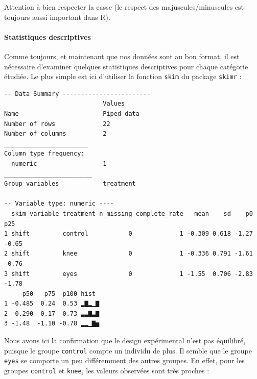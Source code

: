 \documentclass[a4paperpaper,]{article}
\newenvironment{Shaded}{\begin{snugshade}}{\end{snugshade}}
\newcommand{\KeywordTok}[1]{\textcolor[rgb]{0.12,0.11,0.11}{\textbf{#1}}}
\newcommand{\NormalTok}[1]{\textcolor[rgb]{0.12,0.11,0.11}{#1}}
\newcommand{\OperatorTok}[1]{\textcolor[rgb]{0.12,0.11,0.11}{#1}}
\newcommand{\StringTok}[1]{\textcolor[rgb]{0.75,0.01,0.01}{#1}}
\let\oldparagraph\paragraph
\renewcommand{\paragraph}[1]{\oldparagraph{#1}\mbox{}}
\begin{document}
Attention à bien respecter la casse (le respect des majuscules/minuscules est toujours aussi important dans R).

\hypertarget{statistiques-descriptives-3}{%
\paragraph{Statistiques descriptives}\label{statistiques-descriptives-3}}

Comme toujours, et maintenant que nos données sont au bon format, il est nécessaire d'examiner quelques statistiques descriptives pour chaque catégorie étudiée. Le plus simple est ici d'utiliser la fonction \texttt{skim} du package \texttt{skimr} :

\begin{Shaded}
\end{Shaded}

\begin{verbatim}
-- Data Summary ------------------------
                           Values    
Name                       Piped data
Number of rows             22        
Number of columns          2         
_______________________              
Column type frequency:               
  numeric                  1         
________________________             
Group variables            treatment 

-- Variable type: numeric ----
  skim_variable treatment n_missing complete_rate   mean    sd    p0   p25
1 shift         control           0             1 -0.309 0.618 -1.27 -0.65
2 shift         knee              0             1 -0.336 0.791 -1.61 -0.76
3 shift         eyes              0             1 -1.55  0.706 -2.83 -1.78
     p50   p75  p100 hist 
1 -0.485  0.24  0.53 ▂▇▂▁▇
2 -0.290  0.17  0.73 ▃▃▇▃▇
3 -1.48  -1.10 -0.78 ▂▂▁▇▅
\end{verbatim}

Nous avons ici la confirmation que le design expérimental n'est pas équilibré, puisque le groupe \texttt{control} compte un individu de plus. Il semble que le groupe \texttt{eyes} se comporte un peu différemment des autres groupes. En effet, pour les groupes \texttt{control} et \texttt{knee}, les valeurs observées sont très proches :
\end{document}
